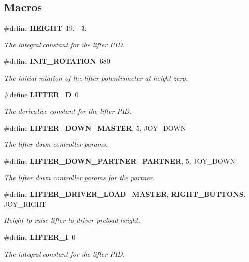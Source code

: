 \subsection*{Macros}
\begin{DoxyCompactItemize}
\item 
\#define \textbf{ H\+E\+I\+G\+HT}~19. -\/ 3.
\begin{DoxyCompactList}\small\item\em The integral constant for the lifter P\+ID. \end{DoxyCompactList}\item 
\#define \textbf{ I\+N\+I\+T\+\_\+\+R\+O\+T\+A\+T\+I\+ON}~680
\begin{DoxyCompactList}\small\item\em The initial rotation of the lifter potentiometer at height zero. \end{DoxyCompactList}\item 
\#define \textbf{ L\+I\+F\+T\+E\+R\+\_\+D}~0
\begin{DoxyCompactList}\small\item\em The derivative constant for the lifter P\+ID. \end{DoxyCompactList}\item 
\#define \textbf{ L\+I\+F\+T\+E\+R\+\_\+\+D\+O\+WN}~\textbf{ M\+A\+S\+T\+ER}, 5, J\+O\+Y\+\_\+\+D\+O\+WN
\begin{DoxyCompactList}\small\item\em The lifter down controller params. \end{DoxyCompactList}\item 
\#define \textbf{ L\+I\+F\+T\+E\+R\+\_\+\+D\+O\+W\+N\+\_\+\+P\+A\+R\+T\+N\+ER}~\textbf{ P\+A\+R\+T\+N\+ER}, 5, J\+O\+Y\+\_\+\+D\+O\+WN
\begin{DoxyCompactList}\small\item\em The lifter down controller params for the partner. \end{DoxyCompactList}\item 
\#define \textbf{ L\+I\+F\+T\+E\+R\+\_\+\+D\+R\+I\+V\+E\+R\+\_\+\+L\+O\+AD}~\textbf{ M\+A\+S\+T\+ER}, \textbf{ R\+I\+G\+H\+T\+\_\+\+B\+U\+T\+T\+O\+NS}, J\+O\+Y\+\_\+\+R\+I\+G\+HT
\begin{DoxyCompactList}\small\item\em Height to raise lifter to driver preload height. \end{DoxyCompactList}\item 
\#define \textbf{ L\+I\+F\+T\+E\+R\+\_\+I}~0
\begin{DoxyCompactList}\small\item\em The integral constant for the lifter P\+ID. \end{DoxyCompactList}\item 

\end{DoxyCompactItemize}
